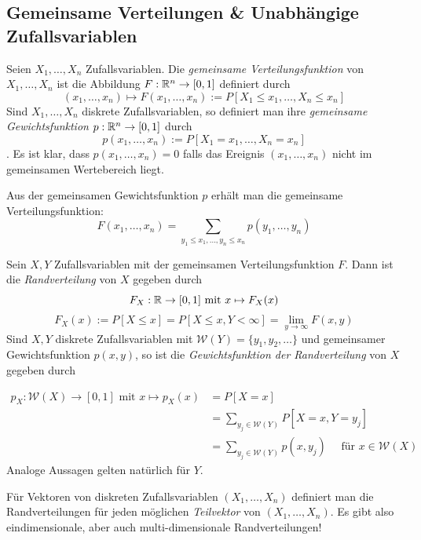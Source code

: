 \subsection{Gemeinsame Verteilungen \& Unabhängige Zufallsvariablen}
\begin{definition}
Seien $X_1,\dots, X_n$ Zufallsvariablen. Die \textit{gemeinsame Verteilungsfunktion} von $X_1,\dots,X_n$ ist die Abbildung $F:\mathbb{R}^n \to [0,1]$ definiert durch 
$$ (x_1,\dots,x_n) \mapsto F(x_1,\dots,x_n) := P[X_1 \leq x_1, \dots, X_n \leq x_n]$$
Sind $X_1, \dots, X_n$ diskrete Zufallsvariablen, so definiert man ihre \textit{gemeinsame Gewichtsfunktion} $p:\mathbb{R}^n \to [0,1]$ durch 
$$ p(x_1,\dots,x_n):= P[X_1 = x_1, \dots, X_n = x_n]$$.
Es ist klar, dass $p(x_1,\dots,x_n) = 0$ falls das Ereignis $(x_1, \dots, x_n)$ nicht im gemeinsamen Wertebereich liegt.
\end{definition}
Aus der gemeinsamen Gewichtsfunktion $p$ erhält man die gemeinsame Verteilungsfunktion:
$$ F(x_1, \dots, x_n) = \sum_{y_1 \leq x_1, \dots, y_n \leq x_n} p(y_1,\dots,y_n)$$

\begin{definition}
Sein $X,Y$ Zufallsvariablen mit der gemeinsamen Verteilungsfunktion $F$. Dann ist die \textit{Randverteilung} von $X$ gegeben durch
$$F_X:\mathbb{R} \to [0,1] \mbox{  mit  } x\mapsto F_X(x)$$ $$F_X(x) := P[X \leq x] = P[X \leq x, Y < \infty] = \lim_{y\to \infty} F(x,y)$$
Sind $X,Y$ diskrete Zufallsvariablen mit $\mathcal{W}(Y) = \{y_1,y_2,\dots \}$ und gemeinsamer Gewichtsfunktion $p(x,y)$, so ist die \textit{Gewichtsfunktion der Randverteilung} von $X$ gegeben durch

\begin{align*}
	p_X: \mathcal{W}(X) \to [0,1] \mbox{  mit  } x \mapsto p_X(x) &= P[X=x] \\&= \sum_{y_j \in \mathcal{W}(Y)} P[X=x, Y = y_j] \\&= \sum_{y_j \in \mathcal{W}(Y)} p(x,y_j) \quad \mbox{ für } x\in \mathcal{W}(X)
\end{align*}
Analoge Aussagen gelten natürlich für $Y$.
\end{definition} 

Für Vektoren von diskreten Zufallsvariablen $(X_1, \dots, X_n)$ definiert man die Randverteilungen für jeden möglichen \textit{Teilvektor} von $(X_1,\dots, X_n)$. Es gibt also eindimensionale, aber auch multi-dimensionale Randverteilungen!\\

